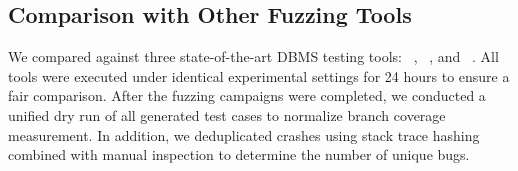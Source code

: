 \documentclass[sigconf,review,anonymous]{acmart}
\begin{document}
\subsection{Comparison with Other Fuzzing Tools}

We compared \tool{} against three state-of-the-art DBMS testing tools: \sqlancer{}~\cite{sqlancer}, \squirrel{}~\cite{zhong2020squirrel}, and \sedar{}~\cite{fu2024sedar}. 
All tools were executed under identical experimental settings for 24 hours to ensure a fair comparison.
After the fuzzing campaigns were completed, we conducted a unified dry run of all generated test cases to normalize branch coverage measurement. 
In addition, we deduplicated crashes using stack trace hashing combined with manual inspection to determine the number of unique bugs.
\end{document}
